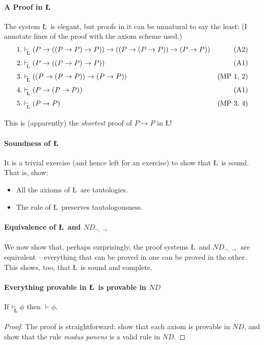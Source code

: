 {\paragraph{A Proof in \L}

The system \L\ is  elegant, but proofs in it can be unnatural to say the least: (I annotate lines of the proof with the axiom scheme used.)
\begin{align*}
 1. &\lvdash (P\to((P\to P)\to P)) \to ((P\to(P\to P))\to(P\to P)) & \text{(A2)}\\
2. &\lvdash (P\to((P\to P)\to P)) &\text{(A1)}\\
3. &\lvdash ((P\to(P\to P))\to(P\to P)) &\text{(MP 1, 2)}\\
4. &\lvdash (P \to (P\to P)) & \text{(A1)}\\
5. &\lvdash (P\to P)&\text{(MP 3, 4)}
\end{align*} 

This is (apparently) the \emph{shortest} proof of $P \to P$ in \L!

\paragraph{Soundness of \L}

It is a trivial exercise (and hence left for an exercise) to show that \L\ is sound. That is, show: \begin{itemize}
	\item All the axioms of \L\ are tautologies.
	\item The rule of \L\ preserves tautologousness.
\end{itemize}

\paragraph{Equivalence of \L\ and $ND_{\neg,\to}$}

We now show that, perhaps surprisingly, the proof systems \L\ and $ND_{\neg,\to}$ are equivalent – everything that can be proved in one can be proved in the other. This shows, too, that \L\ is sound and complete.

\paragraph{Everything provable in \L\ is provable in $ND$}

\begin{theorem}
	If $\lvdash\phi$ then $\vdash\phi$.\end{theorem} \begin{proof}
		{ The proof is straightforward: show that each axiom is provable in $ND$, and show that the rule \emph{modus ponens} is a valid rule in $ND$.
		
}
\end{proof}}

